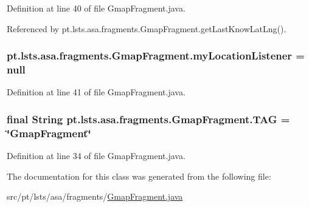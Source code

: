 Definition at line 40 of file Gmap\+Fragment.\+java.



Referenced by pt.\+lsts.\+asa.\+fragments.\+Gmap\+Fragment.\+get\+Last\+Know\+Lat\+Lng().

\hypertarget{classpt_1_1lsts_1_1asa_1_1fragments_1_1GmapFragment_acebab14aaa9af771ab13b151d8576ef9}{}
\subsubsection[{my\+Location\+Listener}]{ pt.\+lsts.\+asa.\+fragments.\+Gmap\+Fragment.\+my\+Location\+Listener = null\hspace{0.3cm}{\ttfamily [private]}}\label{classpt_1_1lsts_1_1asa_1_1fragments_1_1GmapFragment_acebab14aaa9af771ab13b151d8576ef9}


Definition at line 41 of file Gmap\+Fragment.\+java.

\hypertarget{classpt_1_1lsts_1_1asa_1_1fragments_1_1GmapFragment_a82229b8ab24e3f6c61eb2a0da23d51a9}{}
\subsubsection[{T\+A\+G}]{\setlength{\rightskip}{0pt plus 5cm}final String pt.\+lsts.\+asa.\+fragments.\+Gmap\+Fragment.\+T\+A\+G = \char`\"{}Gmap\+Fragment\char`\"{}\hspace{0.3cm}{\ttfamily [static]}}\label{classpt_1_1lsts_1_1asa_1_1fragments_1_1GmapFragment_a82229b8ab24e3f6c61eb2a0da23d51a9}


Definition at line 34 of file Gmap\+Fragment.\+java.



The documentation for this class was generated from the following file\+:\begin{DoxyCompactItemize}
\item 
src/pt/lsts/asa/fragments/\hyperlink{GmapFragment_8java}{Gmap\+Fragment.\+java}\end{DoxyCompactItemize}
